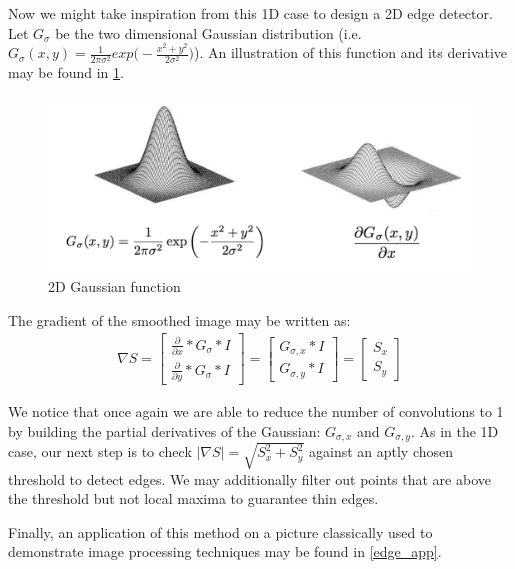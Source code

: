 \documentclass[twoside]{article}
\begin{document}
Now we might take inspiration from this 1D case to design a 2D edge detector. Let $G_\sigma$ be the two dimensional Gaussian distribution (i.e. $G_\sigma(x,y)=\frac{1}{2\pi\sigma^2}exp\bigg(-\frac{x^2+y^2}{2\sigma^2}\bigg)$). An illustration of this function and its derivative may be found in \ref{2dgauss}.

\begin{figure}[h]
  \centering
  \includegraphics[scale=.3]{2d_equivalent.PNG}
    \caption{2D Gaussian function}
    \label{2dgauss}
\end{figure}

The gradient of the smoothed image may be written as:
\begin{gather*}
\nabla S= \begin{bmatrix}
\frac{\partial}{\partial x} * G_\sigma * I \\ \frac{\partial}{\partial y} * G_\sigma * I \end{bmatrix}= \begin{bmatrix}
G_{\sigma,x} * I\\G_{\sigma,y} * I
\end{bmatrix}=\begin{bmatrix}
S_x\\S_y
\end{bmatrix}
\end{gather*}

We notice that once again we are able to reduce the number of convolutions to 1 by building the partial derivatives of the Gaussian: $G_{\sigma,x}$ and $G_{\sigma,y}$. As in the 1D case, our next step is to check $|\nabla S| =\sqrt{S_x^2+S_y^2}$ against an aptly chosen threshold to detect edges. We may additionally filter out points that are above the threshold but not local maxima to guarantee thin edges.

Finally, an application of this method on a picture classically used to demonstrate image processing techniques may be found in \ref{edge_app}.\\
\end{document}
